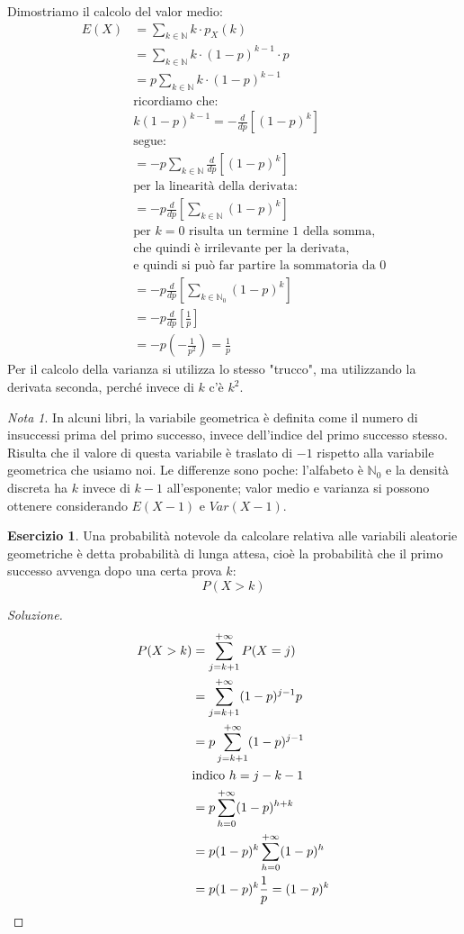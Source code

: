 \documentclass{article}
\theoremstyle{plain}
\theoremstyle{definition}
\newtheorem{esercizio}{Esercizio}[section]
\theoremstyle{remark}
\newtheorem*{nota}{Nota}
\newenvironment{soluzione}
	{\renewcommand\qedsymbol{$\mathwitch*$}\begin{proof}[Soluzione]}
	{\end{proof}}
\renewcommand{\qedsymbol}{$\mathrightghost$}
\begin{document}
Dimostriamo il calcolo del valor medio:
\begin{align*}
	E(X)&=\sum_{k\in\mathds{N}}k\cdot p_X(k)\\
	&=\sum_{k\in\mathds{N}}k\cdot(1-p)^{k-1}\cdot p\\
	&=p\sum_{k\in\mathds{N}}k\cdot(1-p)^{k-1}\\
	&\text{ricordiamo che:}\\
	&k(1-p)^{k-1}=-\frac{d}{dp}[(1-p)^k]\\
	&\text{segue:}\\
	&=-p\sum_{k\in\mathds{N}}\frac{d}{dp}[(1-p)^k]\\
	&\text{per la linearità della derivata:}\\
	&=-p\frac{d}{dp}\left[\sum_{k\in\mathds{N}}(1-p)^k\right]\\
	&\text{per $k=0$ risulta un termine $1$ della somma,}\\
	&\text{che quindi è irrilevante per la derivata,}\\
	&\text{e quindi si può far partire la sommatoria da $0$}\\
	&=-p\frac{d}{dp}\left[\sum_{k\in\mathds{N}_0}(1-p)^k\right]\\
	&=-p\frac{d}{dp}\left[\frac{1}{p}\right]\\
	&=-p\left(-\frac{1}{p^2}\right)=\frac{1}{p}
\end{align*}
Per il calcolo della varianza si utilizza lo stesso "trucco", ma utilizzando la derivata seconda, perché invece di $k$ c'è $k^2$.
\begin{nota}
	In alcuni libri, la variabile geometrica è definita come il numero di insuccessi prima del primo successo, invece dell'indice del primo successo stesso. Risulta che il valore di questa variabile è traslato di $-1$ rispetto alla variabile geometrica che usiamo noi. Le differenze sono poche: l'alfabeto è $\mathds{N}_0$ e la densità discreta ha $k$ invece di $k-1$ all'esponente; valor medio e varianza si possono ottenere considerando $E(X-1)$ e $Var(X-1)$.
\end{nota}
\begin{esercizio}
	Una probabilità notevole da calcolare relativa alle variabili aleatorie geometriche è detta probabilità di lunga attesa, cioè la probabilità che il primo successo avvenga dopo una certa prova $k$:
	\begin{equation*}
		P(X>k)
	\end{equation*}
	\begin{soluzione}
		\begin{align*}
			P(X>k)&=\sum_{j=k+1}^{+\infty}P(X=j)\\
			&=\sum_{j=k+1}^{+\infty}(1-p)^{j-1}p\\
			&=p\sum_{j=k+1}^{+\infty}(1-p)^{j-1}\\
			&\text{indico }h=j-k-1\\
			&=p\sum_{h=0}^{+\infty}(1-p)^{h+k}\\
			&=p(1-p)^k\sum_{h=0}^{+\infty}(1-p)^h\\
			&=p(1-p)^k\frac{1}{p}=(1-p)^k\qedhere
		\end{align*}
	\end{soluzione}
\end{esercizio}
\end{document}

